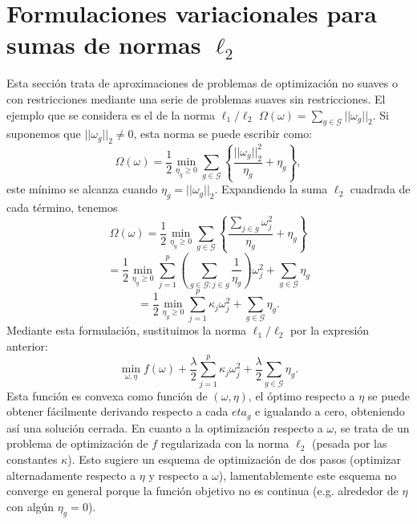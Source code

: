 \documentclass[12pt,draftcls, onecolumn, letterpaper,compsoc]{IEEEtran}
\begin{document}
\section{Formulaciones variacionales para sumas de normas $\ell_2$}
Esta secci\'{o}n trata de aproximaciones de problemas de optimizaci\'{o}n no suaves o con restricciones mediante una serie de problemas suaves sin restricciones. El ejemplo que se considera es el de la norma $\ell_1/\ell_2$ $\Omega(\omega) = \sum_{g\in \mathcal{G}} ||\omega_g||_2$. Si suponemos que $||\omega_g||_2 \neq 0$, esta norma se puede escribir como:
\begin{displaymath}
    \Omega(\omega) = \frac{1}{2} \min_{\eta_g \geq 0}\sum_{g\in\mathcal{G}} \left\lbrace \frac{||\omega_g||_2^2}{\eta_g} + \eta_g\right\rbrace,
\end{displaymath}
este m\'{i}nimo se alcanza cuando $\eta_g = ||\omega_g||_2$. Expandiendo la suma $\ell_2$ cuadrada de cada t\'{e}rmino, tenemos
\begin{displaymath}
    \Omega(\omega) = \frac{1}{2} \min_{\eta_g \geq 0}\sum_{g\in\mathcal{G}} \left\lbrace \frac{\sum_{j\in g}\omega_j^2}{\eta_g} + \eta_g\right\rbrace
\end{displaymath}
\begin{displaymath}
    = \frac{1}{2} \min_{\eta_g \geq 0}\sum_{j=1}^{p} \left(\sum_{g \in \mathcal{G}: j\in g} \frac{1}{\eta_g}\right)\omega_j^2 + \sum_{g \in \mathcal{G}}\eta_g
\end{displaymath}
\begin{displaymath}
    = \frac{1}{2} \min_{\eta_g \geq 0}\sum_{j=1}^{p} \kappa_j\omega_j^2 + \sum_{g \in \mathcal{G}}\eta_g.
\end{displaymath}
Mediante esta formulaci\'{o}n, sustituimos la norma $\ell_1/\ell_2$ por la expresi\'{o}n anterior:
\begin{displaymath}
    \min_{\omega, \eta} f(\omega) + \frac{\lambda}{2}\sum_{j=1}^{p} \kappa_j\omega_j^2 + \frac{\lambda}{2}\sum_{g\in\mathcal{G}}\eta_g.
\end{displaymath}
Esta funci\'{o}n es convexa como funci\'{o}n de $(\omega, \eta)$, el \'{o}ptimo respecto a $\eta$ se puede obtener f\'{a}cilmente derivando respecto a cada $eta_g$ e igualando a cero, obteniendo as\'{i} una soluci\'{o}n cerrada. En cuanto a la optimizaci\'{o}n respecto a $\omega$, se trata de un problema de optimizaci\'{o}n de $f$ regularizada con la norma $\ell_2$ (pesada por las constantes $\kappa$). Esto sugiere un esquema de optimizaci\'{o}n de dos pasos (optimizar alternadamente respecto a $\eta$ y respecto a $\omega$), lamentablemente este esquema no converge en general porque la funci\'{o}n objetivo no es continua (e.g. alrededor de $\eta$ con alg\'{u}n $\eta_g=0$).
\end{document}
